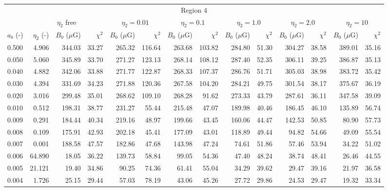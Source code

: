 \begin{tabular}{@{}lrrrrrrrrrrrrr@{}}
\toprule
\multicolumn{14}{c}{Region 4} \\
\cmidrule{1-14}
{} & \multicolumn{3}{c}{$\eta_2$ free} & \multicolumn{2}{c}{$\eta_2 = 0.01$}
   & \multicolumn{2}{c}{$\eta_2 = 0.1$} & \multicolumn{2}{c}{$\eta_2 = 1.0$}
   & \multicolumn{2}{c}{$\eta_2 = 2.0$} & \multicolumn{2}{c}{$\eta_2 = 10$} \\
\cmidrule(lr){2-4} \cmidrule(lr){5-6} \cmidrule(lr){7-8} \cmidrule(lr){9-10}
    \cmidrule(lr){11-12} \cmidrule(lr){13-14}
$a_b$ (-) & $\eta_2$ (-) & $B_0$ ($\mu$G) & $\chi^2$
& $B_0$ ($\mu$G) & $\chi^2$ & $B_0$ ($\mu$G) & $\chi^2$
& $B_0$ ($\mu$G) & $\chi^2$ & $B_0$ ($\mu$G) & $\chi^2$
& $B_0$ ($\mu$G) & $\chi^2$ \\
\cmidrule{1-14}
0.500 & 4.906 & 344.03 & 33.27 & 265.32 & 116.64 & 263.68 & 103.82 & 284.80 & 51.30 & 304.27 & 38.58 & 389.01 & 35.16 \\
0.050 & 5.060 & 345.89 & 33.70 & 271.27 & 123.13 & 268.14 & 108.12 & 287.40 & 52.35 & 306.11 & 39.25 & 386.87 & 35.13 \\
0.040 & 4.882 & 342.06 & 33.88 & 271.77 & 122.87 & 268.33 & 107.37 & 286.76 & 51.71 & 305.03 & 38.98 & 383.72 & 35.42 \\
0.030 & 4.394 & 331.69 & 34.23 & 271.88 & 120.36 & 267.58 & 104.20 & 284.21 & 49.75 & 301.54 & 38.17 & 375.67 & 36.19 \\
0.020 & 3.016 & 299.48 & 35.01 & 268.62 & 109.10 & 268.28 & 91.62 & 273.33 & 43.79 & 287.61 & 36.11 & 347.58 & 39.09 \\
0.010 & 0.512 & 198.31 & 38.77 & 231.27 & 55.44 & 215.48 & 47.07 & 189.98 & 40.46 & 186.45 & 46.10 & 135.89 & 56.74 \\
0.009 & 0.291 & 184.44 & 40.34 & 219.16 & 48.97 & 199.66 & 43.45 & 160.06 & 44.47 & 142.53 & 50.85 & 80.90 & 57.73 \\
0.008 & 0.109 & 175.91 & 42.93 & 202.18 & 45.41 & 177.09 & 43.01 & 118.89 & 49.44 & 94.82 & 54.66 & 49.09 & 55.54 \\
0.007 & 0.001 & 188.58 & 47.57 & 182.86 & 47.68 & 143.98 & 47.24 & 74.61 & 51.86 & 57.46 & 53.94 & 34.22 & 51.02 \\
0.006 & 64.890 & 18.05 & 36.22 & 139.73 & 58.84 & 99.05 & 54.36 & 47.40 & 48.24 & 38.74 & 48.41 & 26.46 & 44.55 \\
0.005 & 21.121 & 19.40 & 34.86 & 90.25 & 74.36 & 61.41 & 55.04 & 34.29 & 39.62 & 29.47 & 39.16 & 21.97 & 36.58 \\
0.004 & 1.726 & 25.15 & 29.44 & 57.03 & 78.19 & 43.06 & 45.26 & 27.72 & 29.86 & 24.53 & 29.47 & 19.32 & 33.34 \\


\end{tabular}
